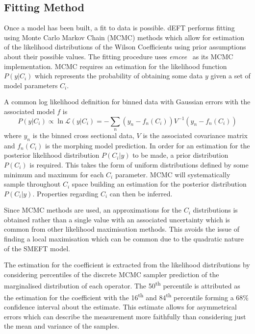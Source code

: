 \documentclass[a4paper,11pt]{article}
\newcommand{\ts}{\textsuperscript}
\begin{document}
\subsection{Fitting Method}\label{sec:fitting}
Once a model has been built, a fit to data is possible.
dEFT performs fitting using Monte Carlo Markov Chain (MCMC) methods which allow for estimation of the likelihood distributions of the Wilson Coefficients using prior assumptions about their possible values.
The fitting procedure uses \emph{emcee}~\cite{Foreman_Mackey_2013} as its MCMC implementation.
MCMC requires an estimation for the likelihood function $P(y | C_{i})$ which represents the probability of obtaining some data $y$ given a set of model parameters $C_{i}$.

A common log likelihood definition for binned data with Gaussian errors with the associated model $f$ is
\begin{equation}\label{eq:likelihood}
    P(y | C_{i}) \propto \ln\mathcal{L}(y | C_{i}) = -\sum\limits_{n} (y_{n} - f_{n}(C_{i})) V^{-1} (y_{n} - f_{n}(C_{i}))
\end{equation}
where $y_{n}$ is the binned cross sectional data, $V$ is the associated covariance matrix and $f_{n}(C_{i})$ is the morphing model prediction.
In order for an estimation for the posterior likelihood distribution $P(C_{i} | y)$ to be made, a prior distribution $P(C_{i})$ is required.
This takes the form of uniform distributions defined by some minimum and maximum for each $C_{i}$ parameter.
MCMC will systematically sample throughout $C_{i}$ space building an estimation for the posterior distribution $P(C_{i}|y)$.
Properties regarding $C_{i}$ can then be inferred.

Since MCMC methods are used, an approximations for the $C_{i}$ distributions is obtained rather than a single value with an associated uncertainty which is common from other likelihood maximisation methods.
This avoids the issue of finding a local maximisation which can be common due to the quadratic nature of the SMEFT model.

The estimation for the coefficient is extracted from the likelihood distributions by considering percentiles of the discrete MCMC sampler prediction of the marginalised distribution of each operator.
The 50\ts{th} percentile is attributed as the estimation for the coefficient with the 16\ts{th} and 84\ts{th} percentile forming a 68\% confidence interval about the estimate.
This estimate allows for asymmetrical errors which can describe the measurement more faithfully than considering just the mean and variance of the samples.
\end{document}
